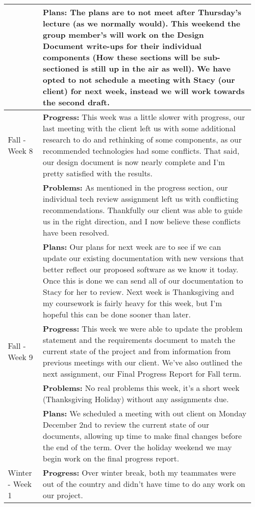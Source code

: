 \begin{longtable}[ht]{| p{1.5cm} | p{13.5cm} |}
     \\ & \textbf{Plans:} The plans are to not meet after Thursday's lecture (as we normally would).
     This weekend the group member's will work on the Design Document write-ups for their individual components (How these sections will be sub-sectioned is still up in the air as well).
     We have opted to not schedule a meeting with Stacy (our client) for next week, instead we will work towards the second draft.
     \\
     \hline
     Fall - Week 8 &
     \textbf{Progress:} This week was a little slower with progress, our last meeting with the client left us with some additional research to do and rethinking of some components, as our recommended technologies had some conflicts.
     That said, our design document is now nearly complete and I'm pretty satisfied with the results.
     \\ & \textbf{Problems:} As mentioned in the progress section, our individual tech review assignment left us with conflicting recommendations.
     Thankfully our client was able to guide us in the right direction, and I now believe these conflicts have been resolved.
     \\ & \textbf{Plans:} Our plans for next week are to see if we can update our existing documentation with new versions that better reflect our proposed software as we know it today.
     Once this is done we can send all of our documentation to Stacy for her to review.
     Next week is Thanksgiving and my coursework is fairly heavy for this week, but I'm hopeful this can be done sooner than later.
     \\
     \hline
     Fall - Week 9 &
     \textbf{Progress:} This week we were able to update the problem statement and the requirements document to match the current state of the project and from information from previous meetings with our client.
     We've also outlined the next assignment, our Final Progress Report for Fall term.
     \\ & \textbf{Problems:} No real problems this week, it's a short week (Thanksgiving Holiday) without any assignments due.
     \\ & \textbf{Plans:} We scheduled a meeting with out client on Monday December 2nd to review the current state of our documents, allowing up time to make final changes before the end of the term.
     Over the holiday weekend we may begin work on the final progress report.
     \\
     \hline
     Winter - Week 1 &
     \textbf{Progress:} Over winter break, both my teammates were out of the country and didn't have time to do any work on our project.

\end{longtable}
